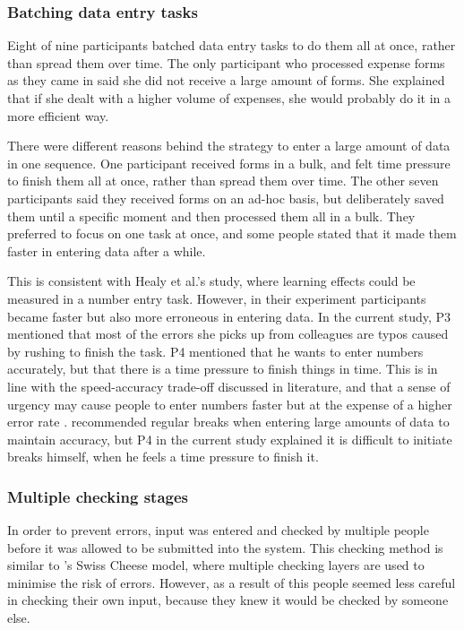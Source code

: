 \subsubsection{Batching data entry tasks}
Eight of nine participants batched data entry tasks to do them all at once, rather than spread them over time. The only participant who processed expense forms as they came in said she did not receive a large amount of forms. She explained that if she dealt with a higher volume of expenses, she would probably do it in a more efficient way.

There were different reasons behind the strategy to enter a large amount of data in one sequence. One participant received forms in a bulk, and felt time pressure to finish them all at once, rather than spread them over time. The other seven participants said they received forms on an ad-hoc basis, but deliberately saved them until a specific moment and then processed them all in a bulk. They preferred to focus on one task at once, and some people stated that it made them faster in entering data after a while. 

This is consistent with Healy et al.'s \citeyearpar{Healy2004} study, where learning effects could be measured in a number entry task. However, in their experiment participants became faster but also more erroneous in entering data. In the current study, P3 mentioned that most of the errors she picks up from colleagues are typos caused by rushing to finish the task. P4 mentioned that he wants to enter numbers accurately, but that there is a time pressure to finish things in time. This is in line with the speed-accuracy trade-off discussed in literature, and that a sense of urgency may cause people to enter numbers faster but at the expense of a higher error rate \citep{Lin2011, Lin2013}.
\citet{Healy2004} recommended regular breaks when entering large amounts of data to maintain accuracy, but P4 in the current study explained it is difficult to initiate breaks himself, when he feels a time pressure to finish it.

\subsubsection{Multiple checking stages}
In order to prevent errors, input was entered and checked by multiple people before it was allowed to be submitted into the system. This checking method is similar to \citeauthor{Reason1990}'s \citeyearpar{Reason1990}  Swiss Cheese model, where multiple checking layers are used to minimise the risk of errors. However, as a result of this people seemed less careful in checking their own input, because they knew it would be checked by someone else. 

